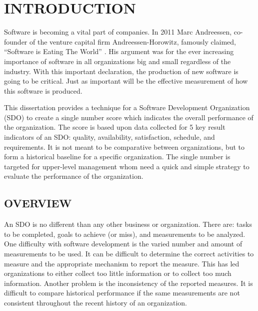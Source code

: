 \documentclass[SDSUThesis.tex]{subfiles}
\begin{document}
\newpage
{}
\setcounter{tocdepth}{2}

\section{INTRODUCTION}

    Software is becoming a vital part of companies. In 2011 Marc Andreessen, 
    co-founder of the venture capital firm Andreessen-Horowitz,
    famously claimed, ``Software is Eating The World'' \cite{Andreessen2001}. 
    His argument was for the ever increasing importance of software
    in all organizations big and small regardless of the industry.  With 
    this important declaration, the production of new software is
    going to be critical.  Just as important will be the effective 
    measurement of how this software is produced.  
    
    This dissertation 
    provides a technique for a Software Development Organization (SDO)
     to create
    a single number score which indicates the overall performance
    of the organization. The
    score is based upon data collected for 5 key result indicators
    of an SDO: quality, availability,
    satisfaction, schedule, and requirements.  It is not meant
    to be comparative between organizations, but to 
    form a historical baseline for a specific organization.  The single
    number is targeted for upper-level management whom need a quick
    and simple strategy to evaluate the performance of the organization.

\subsection{OVERVIEW}
    
    An SDO is no different than 
    any other business or organization.  There are: tasks
    to be completed, goals to achieve (or miss), and measurements
    to be analyzed.  One difficulty with software development
    is the varied number and amount of measurements to be used. 
    It can be difficult to determine the correct activities
    to measure and the appropriate mechanism to report the measure.
    This has led organizations to either collect too little information
    or to collect too much information.  Another problem is the 
    inconsistency of the reported measures.  It is difficult to compare
    historical performance if the same measurements are not consistent
    throughout the recent history of an organization. 
    
\end{document}
